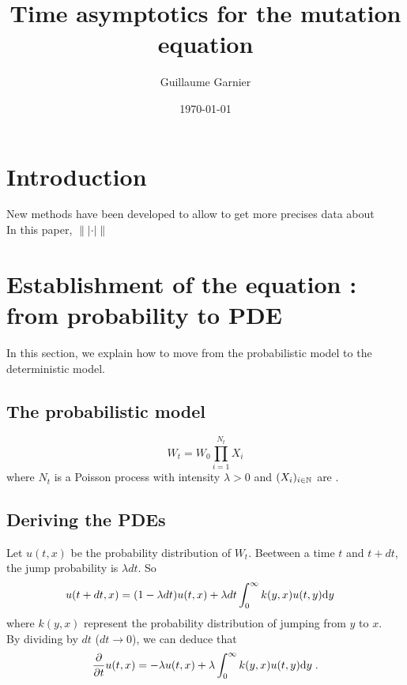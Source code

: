\documentclass[11pt]{amsart}
\title{Time asymptotics for the mutation equation}
\author{Guillaume Garnier}
\date{\today}
\begin{document}
\maketitle
\tableofcontents

\section{Introduction}

New methods have been developed to allow to get more precises data about  
\\

In this paper, $\|| \cdot |\|$


\section{Establishment of the equation : from probability to PDE}


In this section, we explain how to move from the probabilistic model to the deterministic model. 

\subsection{The probabilistic model}
\begin{equation*}
    W_t = W_0 \prod_{i = 1}^{N_t} X_i
\end{equation*}
where $N_t$ is a Poisson process with intensity $\lambda > 0$ and $(X_i)_{i \in \mathbb{N}}$ are \iid.

\subsection{Deriving the PDEs}

Let $u(t,x)$ be the probability distribution of $W_t$. Beetween a time $t$ and $t + dt$, the jump probability is $\lambda dt$. So
    \begin{align*}
        u(t + dt,x) 
        &= (1  - \lambda dt) u(t,x) + \lambda dt \int_0^\infty k(y,x) u (t, y) \mathrm dy
    \end{align*}
where $k(y,x)$ represent the probability distribution of jumping from $y$ to $x$. \\
By dividing by $dt$ ($dt \to 0$), we can deduce that
    \begin{equation*}
        \frac{\partial}{\partial t} u(t,x) 
        =   - \lambda u(t,x) + \lambda \int_0^\infty k(y,x) u (t, y) \mathrm dy  
        \; .
    \end{equation*}
\end{document}
